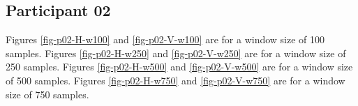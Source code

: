 \documentclass[12pt]{article}
\begin{document}






\newpage
\subsection{Participant 02}
Figures \ref{fig-p02-H-w100} and \ref{fig-p02-V-w100} are for a window size of 100 samples.
Figures \ref{fig-p02-H-w250} and \ref{fig-p02-V-w250} are for a window size of 250 samples.
Figures \ref{fig-p02-H-w500} and \ref{fig-p02-V-w500} are for a window size of 500 samples.
Figures \ref{fig-p02-H-w750} and \ref{fig-p02-V-w750} are for a window size of 750 samples.
\end{document}
